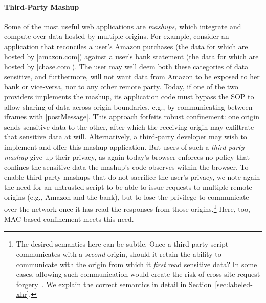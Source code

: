 \paragraph{Third-Party Mashup}
Some of the most useful web applications are {\em mashups,} which
integrate and compute over data hosted by multiple origins. For
example, consider an application that reconciles a user's Amazon
purchases (the data for which are hosted by \js|amazon.com|) against a
user's bank statement (the data for which are hosted by
\js|chase.com|). The user may well deem both these categories of data
sensitive, and furthermore, will not want data from Amazon to be
exposed to her bank or vice-versa, nor to any other remote
party. Today, if one of the two providers implements the mashup, its
application code must bypass the SOP to allow sharing of data across
origin boundaries, e.g., by communicating between iframes with
\js|postMessage|. This approach forfeits robust confinement: one
origin sends sensitive data to the other, after which the receiving
origin may exfiltrate that sensitive data at will. Alternatively, a
third-party developer may wish to implement and offer this mashup
application. But users of such a {\em third-party mashup} give up
their privacy, as again today's browser enforces no policy that
confines the sensitive data the mashup's code observes within the
browser. To enable third-party mashups that do not sacrifice the
user's privacy, we note again the need for an untrusted script to be
able to issue requests to multiple remote origins (e.g., Amazon and
the bank), but to lose the privilege to communicate over the network
once it has read the responses from those origins.\footnote{The
  desired semantics here can be subtle. Once a third-party script
  communicates with a \emph{second} origin, should it retain the
  ability to communicate with the origin from which it \emph{first}
  read sensitive data? In some cases, allowing such communication
  would create the risk of cross-site request
  forgery~. We explain the correct semantics in detail in
  Section~\ref{sec:labeled-xhr}.}  Here, too, MAC-based confinement meets this need.

